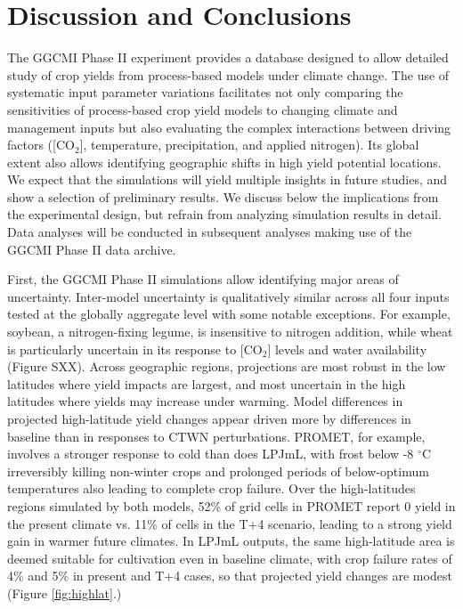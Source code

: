 \documentclass[gmd, manuscript]{copernicus} %
\begin{document}
\section{Discussion and Conclusions} 
\label{S:5}
The GGCMI Phase II experiment provides a database designed to allow detailed study of crop yields from process-based models under climate change. 
The use of systematic input parameter variations facilitates not only comparing the sensitivities of process-based crop yield models to changing climate and management inputs but also evaluating the complex interactions between driving factors ([CO$_2$], temperature, precipitation, and applied nitrogen). 
Its global extent also allows identifying geographic shifts in high yield potential locations. 
We expect that the simulations will yield multiple insights in future studies, and show a selection of preliminary results. 
We discuss below the implications from the experimental design, but refrain from analyzing simulation results in detail. 
Data analyses will be conducted in subsequent analyses making use of the GGCMI Phase II data archive.

First, the GGCMI Phase II simulations allow identifying major areas of uncertainty. 
Inter-model uncertainty is qualitatively similar across all four inputs tested at the globally aggregate level with some notable exceptions. 
For example, soybean, a nitrogen-fixing legume, is insensitive to nitrogen addition, while wheat is particularly uncertain in its response to [CO$_2$] levels and water availability (Figure SXX). 
Across geographic regions, projections are most robust in the low latitudes where yield impacts are largest, and most uncertain in the high latitudes where yields may increase under warming. 
Model differences in projected high-latitude yield changes appear driven more by differences in baseline than in responses to CTWN perturbations.  
PROMET, for example, involves a stronger response to cold than does LPJmL, with frost below -8 $^\circ$C irreversibly killing non-winter crops and prolonged periods of below-optimum temperatures also leading to complete crop failure. 
Over the high-latitudes regions simulated by both models, 52\% of grid cells in PROMET report 0 yield in the present climate vs. 11\% of cells in the T+4 scenario, leading to a strong yield gain in warmer future climates. 
In LPJmL outputs, the same high-latitude area is deemed suitable for cultivation even in baseline climate, with crop failure rates of 4\% and 5\% in present and T+4 cases, so that projected yield changes are modest (Figure \ref{fig:highlat}.)
\end{document}

